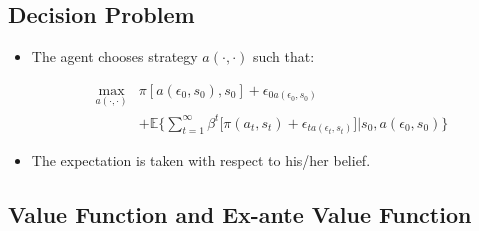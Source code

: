 \documentclass[]{book}
\providecommand{\tightlist}{%
  \setlength{\itemsep}{0pt}\setlength{\parskip}{0pt}}
\begin{document}
\subsection{Decision Problem}\label{decision-problem}

\begin{itemize}
\tightlist
\item
  The agent chooses strategy \(a(\cdot, \cdot)\) such that:

  \begin{equation}
  \begin{split}
  \max_{a(\cdot, \cdot)} & \pi[a(\epsilon_0, s_0), s_0] + \epsilon_{0 a(\epsilon_0, s_0)}\\
  &+ \mathbb{E}\Bigg\{ \sum_{t = 1}^\infty \beta^t \Bigg[\pi(a_t, s_t) + \epsilon_{t a(\epsilon_t, s_t)}\Bigg]\Bigg|s_0, a(\epsilon_0, s_0)\Bigg\}
  \end{split}
  \end{equation}
\item
  The expectation is taken with respect to his/her belief.
\end{itemize}

\subsection{Value Function and Ex-ante Value
Function}\label{value-function-and-ex-ante-value-function}
\end{document}
